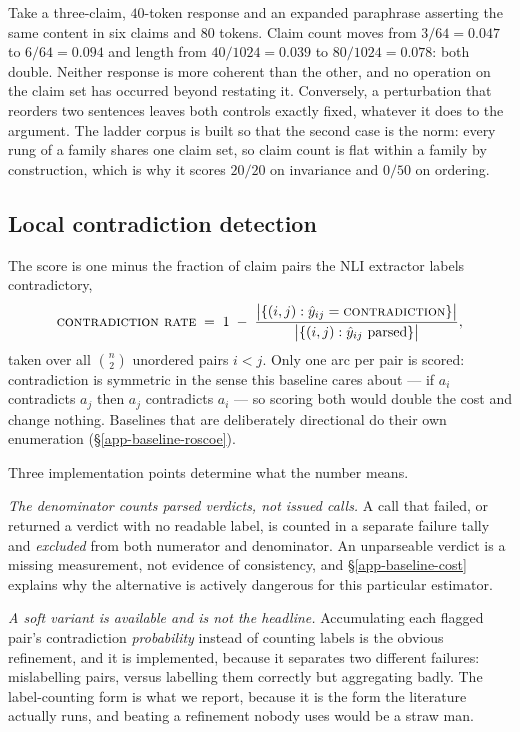 \begin{example}
Take a three-claim, $40$-token response and an expanded paraphrase asserting the same content in six
claims and $80$ tokens. Claim count moves from $3/64=0.047$ to $6/64=0.094$ and length from
$40/1024=0.039$ to $80/1024=0.078$: both double. Neither response is more coherent than the other, and
no operation on the claim set has occurred beyond restating it. Conversely, a perturbation that
reorders two sentences leaves both controls exactly fixed, whatever it does to the argument. The
ladder corpus is built so that the second case is the norm: every rung of a family shares one claim
set, so claim count is flat within a family by construction, which is why it scores $20/20$ on
invariance and $0/50$ on ordering.
\end{example}


\subsection{Local contradiction detection}
\label{app-baseline-contradiction}

The score is one minus the fraction of claim pairs the NLI extractor labels contradictory,
\begin{equation}
\textsc{contradiction rate} \;=\; 1 \;-\; \frac{\bigl|\{(i,j) : \hat{y}_{ij} = \textsc{contradiction}\}\bigr|}
                                               {\bigl|\{(i,j) : \hat{y}_{ij} \ \text{parsed}\}\bigr|},
\label{eq-contradiction-rate}
\end{equation}
taken over all $\binom{n}{2}$ unordered pairs $i<j$. Only one arc per pair is scored: contradiction is
symmetric in the sense this baseline cares about --- if $a_i$ contradicts $a_j$ then $a_j$ contradicts
$a_i$ --- so scoring both would double the cost and change nothing. Baselines that are deliberately
directional do their own enumeration (\S\ref{app-baseline-roscoe}).

Three implementation points determine what the number means.

\emph{The denominator counts parsed verdicts, not issued calls.} A call that failed, or returned a
verdict with no readable label, is counted in a separate failure tally and \emph{excluded} from both
numerator and denominator. An unparseable verdict is a missing measurement, not evidence of
consistency, and \S\ref{app-baseline-cost} explains why the alternative is actively dangerous for this
particular estimator.

\emph{A soft variant is available and is not the headline.} Accumulating each flagged pair's
contradiction \emph{probability} instead of counting labels is the obvious refinement, and it is
implemented, because it separates two different failures: mislabelling pairs, versus labelling them
correctly but aggregating badly. The label-counting form is what we report, because it is the form the
literature actually runs, and beating a refinement nobody uses would be a straw man.

